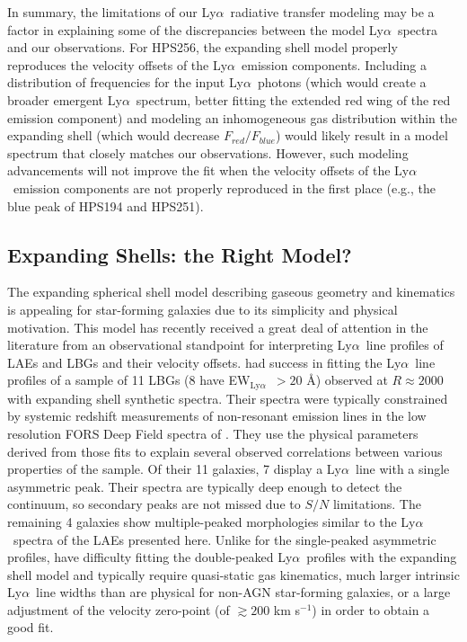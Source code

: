 \documentclass{emulateapj}
\newcommand{\lya}{Ly$\alpha$}
\def\ewlya{EW$_{\mathrm{Ly}\alpha}$}
\begin{document}
In summary, the limitations of our \lya\ radiative transfer modeling may be a factor in explaining some of the discrepancies between the model \lya\ spectra and our observations. For HPS256, the expanding shell model properly reproduces the velocity offsets of the \lya\ emission components. Including a distribution of frequencies for the input \lya\ photons (which would create a broader emergent \lya\ spectrum, better fitting the extended red wing of the red emission component) and modeling an inhomogeneous gas distribution within the expanding shell (which would decrease $F_{red} / F_{blue}$) would likely result in a model spectrum that closely matches our observations. However, such modeling advancements will not improve the fit when the velocity offsets of the \lya\ emission components are not properly reproduced in the first place (e.g., the blue peak of HPS194 and HPS251).

\subsection{Expanding Shells: the Right Model?}\label{subsec:ShellsCorrect}
The expanding spherical shell model describing gaseous geometry and kinematics is appealing for star-forming galaxies due to its simplicity and physical motivation. This model has recently received a great deal of attention in the literature from an observational standpoint for interpreting \lya\ line profiles of LAEs and LBGs and their velocity offsets. \citet{verhamme2008} had success in fitting the \lya\ line profiles of a sample of 11 LBGs (8 have \ewlya\ $> 20$ \AA) observed at $R\approx2000$ with expanding shell synthetic spectra. Their spectra were typically constrained by systemic redshift measurements of non-resonant emission lines in the low resolution FORS Deep Field spectra of \citet{noll2004}. They use the physical parameters derived from those fits to explain several observed correlations between various properties of the sample. Of their 11 galaxies, 7 display a \lya\ line with a single asymmetric peak. Their spectra are typically deep enough to detect the continuum, so secondary peaks are not missed due to $S/N$ limitations. The remaining 4 galaxies show multiple-peaked morphologies similar to the \lya\ spectra of the LAEs presented here. Unlike for the single-peaked asymmetric profiles, \citet{verhamme2008} have difficulty fitting the double-peaked \lya\ profiles with the expanding shell model and typically require quasi-static gas kinematics, much larger intrinsic \lya\ line widths than are physical for non-AGN star-forming galaxies, or a large adjustment of the velocity zero-point (of $\gtrsim200$ km s$^{-1}$) in order to obtain a good fit. 
\end{document}
